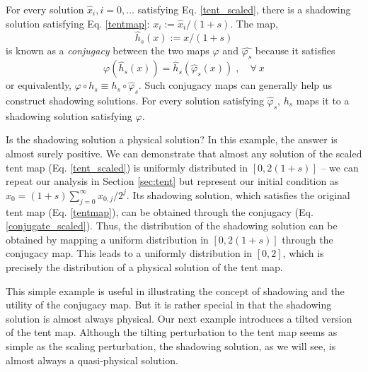 For every solution $\hat{x}_i,i=0,\ldots$ satisfying Eq. \ref{tent_scaled}, there is a shadowing solution satisfying Eq. \ref{tentmap}: $x_i:= \hat{x}_i/(1+s)$.  The map,
\begin{equation} \label{conjugate_scaled}
    \hat{h}_s(x):=x/(1+s)
\end{equation}
is known as a \emph{conjugacy} between the two maps $\varphi$ and $\hat{\varphi_s}$ 
because it satisfies
\begin{equation} \label{conjugate_def}
    \varphi(\hat{h}_s(x)) = \hat{h}_s(\hat\varphi_s(x))\;,\quad \forall\: x
\end{equation}
or equivalently, $\varphi\circ h_s \equiv h_s\circ\hat\varphi_s$.
Such conjugacy maps can generally help us construct shadowing solutions.
For every solution satisfying
$\hat{\varphi}_s$, $h_s$ maps it to a shadowing solution satisfying $\varphi$.

Is the shadowing solution a physical solution?  In this example,
the answer is almost surely positive.  We can demonstrate that
almost any solution of the scaled tent map (Eq. \ref{tent_scaled}) is uniformly
distributed in $[0, 2(1+s)]$ -- we can repeat our analysis
in Section \ref{sec:tent} but represent our initial condition as
$x_0= (1+s) \sum_{j=0}^\infty x_{0,j} / 2^j$.  Its shadowing solution,
which satisfies the original tent map (Eq. \ref{tentmap}), can be obtained through the
conjugacy (Eq. \ref{conjugate_scaled}).  Thus, the distribution
of the shadowing solution can be obtained by mapping a uniform
distribution in $[0,2(1+s)]$ through the conjugacy map.
This leads to a uniformly distribution in $[0,2]$, which is
precisely the distribution of a physical solution of the tent map.

This simple example is useful in illustrating the concept of shadowing
and the utility of the conjugacy map.  But it is rather special
in that the shadowing solution is almost always physical.  Our next
example introduces a tilted version of the tent map.  Although
the tilting perturbation to the tent map seems as simple as the
scaling perturbation, the shadowing solution, as we will see,
is almost always a quasi-physical solution.

